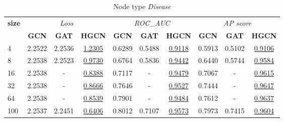 \begin{table}
    \centering
    \begin{subtable}[t]{\textwidth}
        \centering
        \begin{tabular}{l|ccc|ccc|ccc}        
            \toprule
            \multirow{2}{*}{\textbf{size}} & \multicolumn{3}{c}{\textit{Loss}} & \multicolumn{3}{c}{\textit{ROC\_AUC}} & \multicolumn{3}{c}{\textit{AP score}} \\
            & \textbf{GCN} & \textbf{GAT} & \textbf{HGCN} & \textbf{GCN} & \textbf{GAT} & \textbf{HGCN} & \textbf{GCN} & \textbf{GAT} & \textbf{HGCN} \\
            \midrule
                4 & 2.2522 & 2.2536 & \underline{1.2305} & 0.6289 & 0.5488 & \underline{0.9118} & 0.5913 & 0.5102 & \underline{0.9106} \\  
                8 & 2.2538 & 2.2523 & \underline{0.9730} & 0.6764 & 0.5836 & \underline{0.9442} & 0.6440 & 0.5744 & \underline{0.9584} \\
                16 & 2.2538 & - & \underline{0.8388} & 0.7117 & - & \underline{0.9479} & 0.7067 & - & \underline{0.9615} \\
                32 & 2.2538 & - & \underline{0.8666} & 0.7646 & - & \underline{0.9527} & 0.7444 & - & \underline{0.9647} \\
                64 & 2.2538 & - & \underline{0.8539} & 0.7901 & - & \underline{0.9484} & 0.7612 & - & \underline{0.9637} \\
                100 & 2.2537 & 2.2451 & \underline{0.6406} & 0.8012 & 0.7107 & \underline{0.9573} & 0.7973 & 0.7415 & \underline{0.9604} \\
            \bottomrule
        \end{tabular}
        \caption{Node type \textit{Disease}}
    \end{subtable}
    
    \vspace{1em}
    

\end{table}
